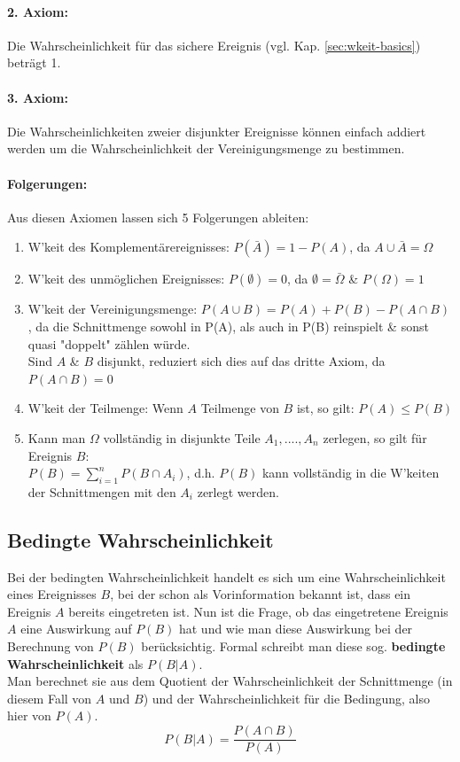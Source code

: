 \documentclass[a4paper]{article}
\newcommand\dangersign{%
 \makebox[1.8em][c]{%
 \makebox[0pt][c]{\raisebox{.15em}{\small!}}%
 \makebox[0pt][c]{\color{red}\Large$\triangle$}}}%
\begin{document}
\paragraph{2. Axiom:} Die Wahrscheinlichkeit für das sichere Ereignis (vgl. Kap. \ref{sec:wkeit-basics}) beträgt 1.

\paragraph{3. Axiom:} Die Wahrscheinlichkeiten zweier disjunkter Ereignisse können einfach addiert werden um die Wahrscheinlichkeit der Vereinigungsmenge zu bestimmen.

\paragraph{Folgerungen:}
Aus diesen Axiomen lassen sich 5 Folgerungen ableiten:
\begin{enumerate}
    \item W'keit des Komplementärereignisses: $P(\bar A) = 1 - P(A)$, da $A \cup \bar A = \Omega$
    \item W'keit des unmöglichen Ereignisses: $P(\emptyset) = 0$, da $\emptyset = \bar \Omega$ \& $P(\Omega) = 1$
    \item W'keit der Vereinigungsmenge: $P(A \cup B) = P(A) + P(B) - P(A \cap B)$, da die Schnittmenge sowohl in P(A), als auch in P(B) reinspielt \& sonst quasi "doppelt" zählen würde.\\
    \dangersign Sind $A$ \& $B$ disjunkt, reduziert sich dies auf das dritte Axiom, da $P(A \cap B) = 0$
    \item W'keit der Teilmenge: Wenn $A$ Teilmenge von $B$ ist, so gilt: $P(A) \leq P(B)$
    \item Kann man $\Omega$ vollständig in disjunkte Teile $A_1,....,A_n$ zerlegen, so gilt für Ereignis $B$:\\$P(B) = \sum_{i=1}^n P(B \cap A_i)$, d.h. $P(B)$ kann vollständig in die W'keiten der Schnittmengen mit den $A_i$ zerlegt werden.
\end{enumerate}

\subsection{Bedingte Wahrscheinlichkeit}\label{sec:bed-wkeit}
Bei der bedingten Wahrscheinlichkeit handelt es sich um eine Wahrscheinlichkeit eines Ereignisses $B$, bei der schon als Vorinformation bekannt ist, dass ein Ereignis $A$ bereits eingetreten ist. Nun ist die Frage, ob das eingetretene Ereignis $A$ eine Auswirkung auf  $P(B)$ hat und wie man diese Auswirkung bei der Berechnung von $P(B)$ berücksichtig. Formal schreibt man diese sog. \textbf{bedingte Wahrscheinlichkeit} als $P(B|A)$.\\
Man berechnet sie aus dem Quotient der Wahrscheinlichkeit der Schnittmenge (in diesem Fall von $A$ und $B$) und der Wahrscheinlichkeit für die Bedingung, also hier von $P(A)$.
$$P(B|A)=\frac{P(A \cap B)}{P(A)}$$
\end{document}
